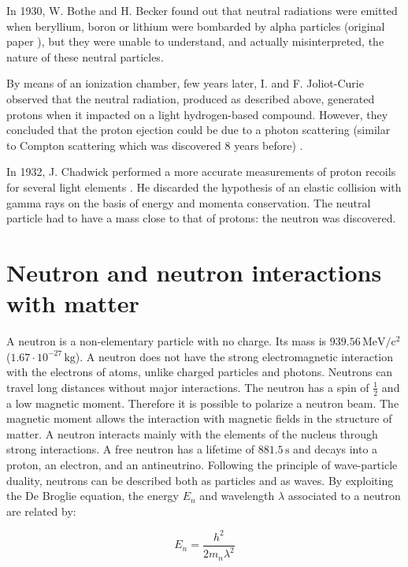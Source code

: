 \begin{refsection}
  In 1930, W. Bothe and H. Becker found out that neutral radiations were emitted when beryllium, boron or lithium were bombarded by alpha particles (original paper \cite{Bothe1930}), but they were unable to understand, and actually misinterpreted, the nature of these neutral particles.

  By means of an ionization chamber, few years later, I. and F. Joliot-Curie observed that the neutral radiation, produced as described above, generated protons when it impacted on a light hydrogen-based compound. However, they concluded that the proton ejection could be due to a photon scattering (similar to Compton scattering which was discovered 8 years before) \cite{curie:jpa-00233129}.

  In 1932, J. Chadwick performed a more accurate measurements of proton recoils for several light elements \cite{Chadwick1932}. He discarded the hypothesis of an elastic collision with gamma rays on the basis of energy and momenta conservation. The neutral particle had to have a mass close to that of protons: the neutron was discovered.

  \section{Neutron and neutron interactions with matter}
  \label{ch1:sec:Neutron}
  A neutron is a non-elementary particle with no charge. Its mass is $939.56\,\mathrm{MeV/c^{2}}$ ($1.67 \cdot 10^{-27}\,\mathrm{kg}$). A neutron does not have the strong electromagnetic interaction with the electrons of atoms, unlike charged particles and photons. Neutrons can travel long distances without major interactions. The neutron has a spin of $\frac{1}{2}$ and a low magnetic moment. Therefore it is possible to polarize a neutron beam. The magnetic moment allows the interaction with magnetic fields in the structure of matter. A neutron interacts mainly with the elements of the nucleus through strong interactions. A free neutron has a lifetime of $881.5\,\mathrm{s}$ and decays into a proton, an electron, and an antineutrino.
  Following the principle of wave-particle duality, neutrons can be described both as particles and as waves. By exploiting the De Broglie equation, the energy $E_{n}$ and wavelength $\lambda$ associated to a neutron are related by:

  \begin{equation}
    E_{n} = \frac{h^{2}}{2m_{n}\lambda^{2}}
  \end{equation}


\end{refsection}
